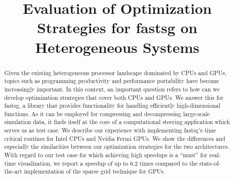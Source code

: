 \documentclass{llncs}
\begin{document}
\title{Evaluation of Optimization Strategies for fastsg on Heterogeneous Systems}
\author{}
\institute{}


\date{}

\maketitle

\begin{abstract}
Given the existing heterogeneous processor landscape dominated by CPUs and GPUs,
topics such as programming productivity and performance portability have become
increasingly important. In this context, an important question refers to how can
we develop optimization strategies that cover both CPUs and GPUs. We answer this
for fastsg, a library that provides functionality for handling efficiently
high-dimensional functions. As it can be employed for compressing and
decompressing large-scale simulation data, it finds itself at the core of a
computational steering application which serves us as test case. We describe our
experience with implementing fastsg's time critical routines for Intel CPUs and
Nvidia Fermi GPUs. We show the differences and especially the similarities
between our optimization strategies for the two architectures. With regard to
our test case for which achieving high speedups is a ``must'' for real-time
visualization, we report a speedup of up to 6.2 times compared to the
state-of-the-art implementation of the sparse grid technique for GPUs.
\end{abstract}



\end{document}
